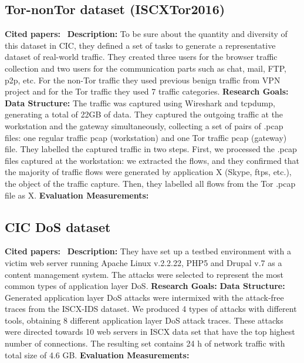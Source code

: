 \subsection{Tor-nonTor dataset (ISCXTor2016)}
\textbf{Cited papers:}~\cite{lashkari2017characterization} \newline
\textbf{Description:} To be sure about the quantity and diversity of this dataset in CIC, they defined a set of tasks to generate a representative dataset of real-world traffic. They created three users for the browser traffic collection and two users for the communication parts such as chat, mail, FTP, p2p, etc. For the non-Tor traffic they used previous benign traffic from VPN project and for the Tor traffic they used 7 traffic categories.\newline
\textbf{Research Goals:}  \newline
\textbf{Data Structure:} The traffic was captured using Wireshark and tcpdump, generating a total of 22GB of data. They captured the outgoing traffic at the workstation and the gateway simultaneously, collecting a set of pairs of .pcap files: one regular traffic pcap (workstation) and one Tor traffic pcap (gateway) file. They labelled the captured traffic in two steps. First, we processed the .pcap files captured at the workstation: we extracted the flows, and they confirmed that the majority of traffic flows were generated by application X (Skype, ftps, etc.), the object of the traffic capture. Then, they labelled all flows from the Tor .pcap file as X.\newline
\textbf{Evaluation Measurements:} \newline




\subsection{CIC DoS dataset}
\textbf{Cited papers:}~\cite{jazi2017detecting} \newline
\textbf{Description:} They have set up a testbed environment with a victim web server running Apache Linux v.2.2.22, PHP5 and Drupal v.7 as a content management system. The attacks were selected to represent the most common types of application layer DoS. \newline
\textbf{Research Goals:}  \newline
\textbf{Data Structure:} Generated application layer DoS attacks were intermixed with the attack-free traces from the ISCX-IDS dataset. We produced 4 types of attacks with different tools, obtaining 8 different application layer DoS attack traces. These attacks were directed towards 10 web servers in ISCX data set that have the top highest number of connections. The resulting set contains 24 h of network traffic with total size of 4.6 GB.\newline
\textbf{Evaluation Measurements:} \newline




